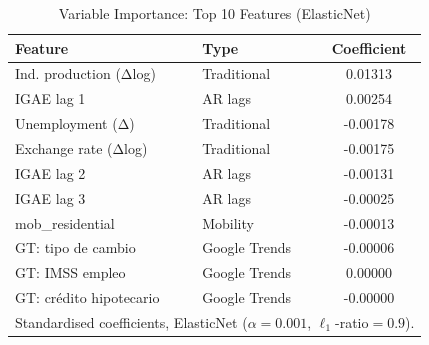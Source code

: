 \begin{table}[htbp]
  \centering
  \caption{Variable Importance: Top 10 Features (ElasticNet)}
  \label{tab:lasso_importance}
  \begin{tabular}{llc}
    \hline\hline
    Feature & Type & Coefficient \\
    \hline
    Ind. production (Δlog) & Traditional & 0.01313 \\
    IGAE lag 1 & AR lags & 0.00254 \\
    Unemployment (Δ) & Traditional & -0.00178 \\
    Exchange rate (Δlog) & Traditional & -0.00175 \\
    IGAE lag 2 & AR lags & -0.00131 \\
    IGAE lag 3 & AR lags & -0.00025 \\
    mob_residential & Mobility & -0.00013 \\
    GT: tipo de cambio & Google Trends & -0.00006 \\
    GT: IMSS empleo & Google Trends & 0.00000 \\
    GT: crédito hipotecario & Google Trends & -0.00000 \\
    \hline
    \multicolumn{3}{l}{\footnotesize Standardised coefficients, ElasticNet ($\alpha=0.001$, $\ell_1$-ratio$=0.9$).} \\
    \hline\hline
  \end{tabular}
\end{table}